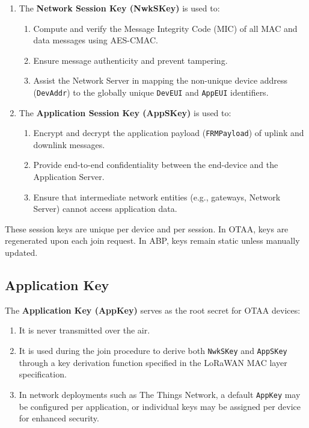 \begin{enumerate}
    \item The \textbf{Network Session Key (NwkSKey)} is used to:
          \begin{enumerate}
              \item Compute and verify the Message Integrity Code (MIC) of all MAC and data messages using AES-CMAC.
              \item Ensure message authenticity and prevent tampering.
              \item Assist the Network Server in mapping the non-unique device address (\texttt{DevAddr}) to the globally unique \texttt{DevEUI} and \texttt{AppEUI} identifiers.
          \end{enumerate}

    \item The \textbf{Application Session Key (AppSKey)} is used to:
          \begin{enumerate}
              \item Encrypt and decrypt the application payload (\texttt{FRMPayload}) of uplink and downlink messages.
              \item Provide end-to-end confidentiality between the end-device and the Application Server.
              \item Ensure that intermediate network entities (e.g., gateways, Network Server) cannot access application data.
          \end{enumerate}
\end{enumerate}

These session keys are unique per device and per session. In OTAA, keys are regenerated upon each join request. In ABP, keys remain static unless manually updated.

\subsection{Application Key}

The \textbf{Application Key (AppKey)} serves as the root secret for OTAA devices:

\begin{enumerate}
    \item It is never transmitted over the air.
    \item It is used during the join procedure to derive both \texttt{NwkSKey} and \texttt{AppSKey} through a key derivation function specified in the LoRaWAN MAC layer specification.
    \item In network deployments such as The Things Network, a default \texttt{AppKey} may be configured per application, or individual keys may be assigned per device for enhanced security.
\end{enumerate}

